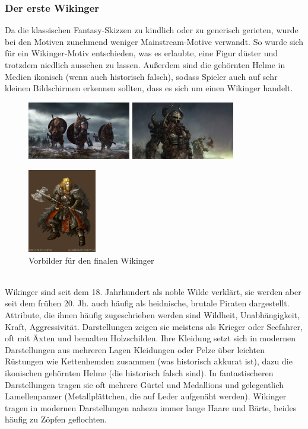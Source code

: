 \documentclass[extern,palatino]{cgBA}
\begin{document}
\subsubsection{Der erste Wikinger}
Da die klassischen Fantasy-Skizzen zu kindlich oder zu generisch gerieten, wurde bei den Motiven zunehmend weniger Mainstream-Motive verwandt. So wurde sich für ein Wikinger-Motiv entschieden, was es erlaubte, eine Figur düster und trotzdem niedlich aussehen zu lassen. Außerdem sind die gehörnten Helme in Medien ikonisch (wenn auch historisch falsch), sodass Spieler auch auf sehr kleinen Bildschirmen erkennen sollten, dass es sich um einen Wikinger handelt.
\begin{figure}
	\raggedleft
	\includegraphics[width=4.5cm]{vikingwallpaper.jpg}
	\centering
	\includegraphics[width=4.5cm]{vikingwallpaper2.jpg}
	\raggedright
	\includegraphics[width=3cm]{vikingwallpaper3.jpg}
	\caption{Vorbilder für den finalen Wikinger}
\end{figure}
\\Wikinger sind seit dem 18. Jahrhundert als noble Wilde verklärt, sie werden aber seit dem frühen 20. Jh. auch häufig als heidnische, brutale Piraten dargestellt. Attribute, die ihnen häufig zugeschrieben werden sind Wildheit, Unabhängigkeit, Kraft, Aggressivität. Darstellungen zeigen sie meistens als Krieger oder Seefahrer, oft mit Äxten und bemalten Holzschilden. Ihre Kleidung setzt sich in modernen Darstellungen aus mehreren Lagen Kleidungen oder Pelze über leichten Rüstungen wie Kettenhemden zusammen (was historisch akkurat ist), dazu die ikonischen gehörnten Helme (die historisch falsch sind). In fantastischeren Darstellungen tragen sie oft mehrere Gürtel und Medallions und gelegentlich Lamellenpanzer (Metallplättchen, die auf Leder aufgenäht werden). Wikinger tragen in modernen Darstellungen nahezu immer lange Haare und Bärte, beides häufig zu Zöpfen geflochten. 
\end{document}
